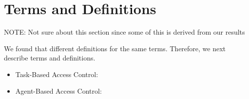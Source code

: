 \section{Terms and Definitions} \label{sec:terms}

NOTE: Not sure about this section since some of this is derived from our results

We found that different definitions for the same terms. Therefore, we next describe
terms and definitions.

\begin{itemize}
	\item Task-Based Access Control:
	\item Agent-Based Access Control:						
\end{itemize}




